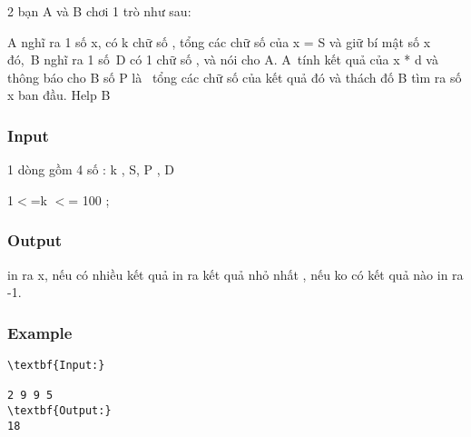 



   2 bạn A và B chơi 1 trò như sau:  

   A nghĩ ra 1 số x, có k chữ số , tổng các chữ số của x = S và giữ bí mật số x đó, B nghĩ ra 1 số D có 1 chữ số , và nói cho A. A tính kết quả của x * d và thông báo cho B số P là  tổng các chữ số của kết quả đó và thách đố B tìm ra số x ban đầu. Help B  

\subsubsection{   Input  }

   1 dòng gồm 4 số : k , S, P , D  

   1$<$=k $<$= 100 ;  

\subsubsection{   Output  }

   in ra x, nếu có nhiều kết quả in ra kết quả nhỏ nhất , nếu ko có kết quả nào in ra -1.  

\subsubsection{   Example  }
\begin{verbatim}
\textbf{Input:}

2 9 9 5
\textbf{Output:}
18
\end{verbatim}